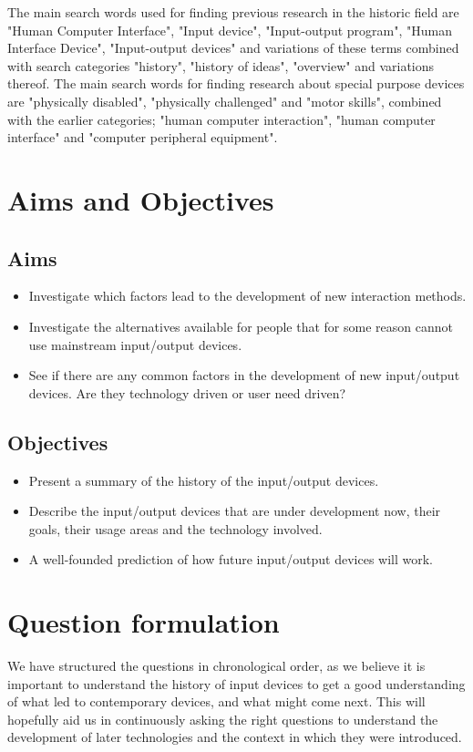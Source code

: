 \documentclass[a4paper,10pt]{article}
\begin{document}
The main search words used for finding previous research in the historic field are "Human Computer Interface", "Input device", "Input-output program", "Human Interface Device", "Input-output devices" and variations of these terms combined with search categories "history", "history of ideas", "overview" and variations thereof. The main search words for finding research about special purpose devices are "physically disabled", "physically challenged" and "motor skills", combined with the earlier categories; "human computer interaction", "human computer interface" and "computer peripheral equipment".

\section{Aims and Objectives}
\subsection{Aims}
\begin{itemize}
\item
Investigate which factors lead to the development of new interaction methods.
\item
Investigate the alternatives available for people that for some reason cannot use mainstream input/output devices.
\item
See if there are any common factors in the development of new input/output devices. Are they technology driven or user need driven?
\end{itemize}
\subsection{Objectives}
\begin{itemize}
\item
Present a summary of the history of the input/output devices.
\item
Describe the input/output devices that are under development now, their goals, their usage areas and the technology involved.
\item
A well-founded prediction of how future input/output devices will work.

\end{itemize}


\section{Question formulation}	

We have structured the questions in chronological order, as we believe it is important to understand the history of input devices to get a good understanding of what led to contemporary devices, and what might come next. This will hopefully aid us in continuously asking the right questions to understand the development of later technologies and the context in which they were introduced.
\end{document}
